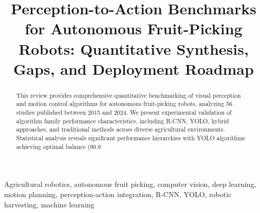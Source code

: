 \documentclass[conference]{IEEEtran}
\begin{document}
\title{Perception-to-Action Benchmarks for Autonomous Fruit-Picking Robots: Quantitative Synthesis, Gaps, and Deployment Roadmap}

\author{
\and
{}
}

\maketitle

\begin{abstract}
This review provides comprehensive quantitative benchmarking of visual perception and motion control algorithms for autonomous fruit-picking robots, analyzing 56 studies published between 2015 and 2024. We present experimental validation of algorithm family performance characteristics, including R-CNN, YOLO, hybrid approaches, and traditional methods across diverse agricultural environments. Statistical analysis reveals significant performance hierarchies with YOLO algorithms achieving optimal balance (90.9%
\end{abstract}

\begin{IEEEkeywords}
Agricultural robotics, autonomous fruit picking, computer vision, deep learning, motion planning, perception-action integration, R-CNN, YOLO, robotic harvesting, machine learning
\end{IEEEkeywords}

\end{document}
